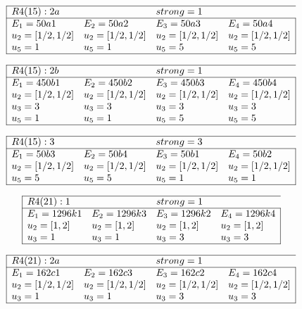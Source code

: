 \documentclass[11pt]{article}
\theoremstyle{definition}
\begin{document}
$$
 \begin{array}{|llll|} 
\hline 
  R4(15):2a  &   & strong=1\\
\hline
 E_1=50a1 & E_2=50a2 & E_3=50a3 & E_4=50a4 \\
  u_{2}=[ 1/2, 1/2 ]&  u_{2}=[ 1/2, 1/2 ]&  u_{2}=[ 1/2, 1/2 ]&  u_{2}=[ 1/2, 1/2 ]\\
  u_{5}=1&  u_{5}=1&  u_{5}=5&  u_{5}=5\\
\hline
\end{array}
 $$


$$
 \begin{array}{|llll|} 
\hline 
  R4(15):2b  &   & strong=1\\
\hline
 E_1=450b1 & E_2=450b2 & E_3=450b3 & E_4=450b4 \\
  u_{2}=[ 1/2, 1/2 ]&  u_{2}=[ 1/2, 1/2 ]&  u_{2}=[ 1/2, 1/2 ]&  u_{2}=[ 1/2, 1/2 ]\\
  u_{3}=3&  u_{3}=3&  u_{3}=3&  u_{3}=3\\
  u_{5}=1&  u_{5}=1&  u_{5}=5&  u_{5}=5\\
\hline
\end{array}
 $$


$$
 \begin{array}{|llll|} 
\hline 
  R4(15):3  &   & strong=3\\
\hline
 E_1=50b3 & E_2=50b4 & E_3=50b1 & E_4=50b2 \\
  u_{2}=[ 1/2, 1/2 ]&  u_{2}=[ 1/2, 1/2 ]&  u_{2}=[ 1/2, 1/2 ]&  u_{2}=[ 1/2, 1/2 ]\\
  u_{5}=5&  u_{5}=5&  u_{5}=1&  u_{5}=1\\
\hline
\end{array}
 $$


$$
 \begin{array}{|llll|} 
\hline 
  R4(21):1  &   & strong=1\\
\hline
 E_1=1296k1 & E_2=1296k3 & E_3=1296k2 & E_4=1296k4 \\
  u_{2}=[ 1, 2 ]&  u_{2}=[ 1, 2 ]&  u_{2}=[ 1, 2 ]&  u_{2}=[ 1, 2 ]\\
  u_{3}=1&  u_{3}=1&  u_{3}=3&  u_{3}=3\\
\hline
\end{array}
 $$


$$
 \begin{array}{|llll|} 
\hline 
  R4(21):2a  &   & strong=1\\
\hline
 E_1=162c1 & E_2=162c3 & E_3=162c2 & E_4=162c4 \\
  u_{2}=[ 1/2, 1/2 ]&  u_{2}=[ 1/2, 1/2 ]&  u_{2}=[ 1/2, 1/2 ]&  u_{2}=[ 1/2, 1/2 ]\\
  u_{3}=1&  u_{3}=1&  u_{3}=3&  u_{3}=3\\
\hline
\end{array}
 $$
\end{document}
